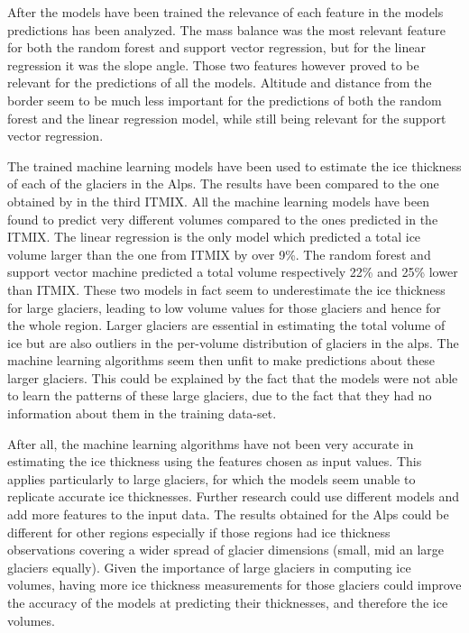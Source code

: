 After the models have been trained the relevance of each feature in the models predictions has been analyzed. The mass balance was the most relevant feature for both the random forest and support vector regression, but for the linear regression it was the slope angle. Those two features however proved to be relevant for the predictions of all the models. Altitude and distance from the border seem to be much less important for the predictions of both the random forest and the linear regression model, while still being relevant for the support vector regression.

The trained machine learning models have been used to estimate the ice thickness of each of the glaciers in the Alps. The results have been compared to the one obtained by \citet{Farinotti2019} in the third ITMIX. All the machine learning models have been found to predict very different volumes compared to the ones predicted in the ITMIX. The linear regression is the only model which predicted a total ice volume larger than the one from ITMIX by over 9\%. The random forest and support vector machine predicted a total volume respectively 22\% and 25\% lower than ITMIX. These two models in fact seem to underestimate the ice thickness for large glaciers, leading to low volume values for those glaciers and hence for the whole region. Larger glaciers are essential in estimating the total volume of ice but are also outliers in the per-volume distribution of glaciers in the alps. The machine learning algorithms seem then unfit to make predictions about these larger glaciers. This could be explained by the fact that the models were not able to learn the patterns of these large glaciers, due to the fact that they had no information about them in the training data-set. 

After all, the machine learning algorithms have not been very accurate in estimating the ice thickness using the features chosen as input values. This applies particularly to large glaciers, for which the models seem unable to replicate accurate ice thicknesses.
Further research could use different models and add more features to the input data.
The results obtained for the Alps could be different for other regions especially if those regions had ice thickness observations covering a wider spread of glacier dimensions (small, mid an large glaciers equally).
Given the importance of large glaciers in computing ice volumes, having more ice thickness measurements for those glaciers could improve the accuracy of the models at predicting their thicknesses, and therefore the ice volumes.
